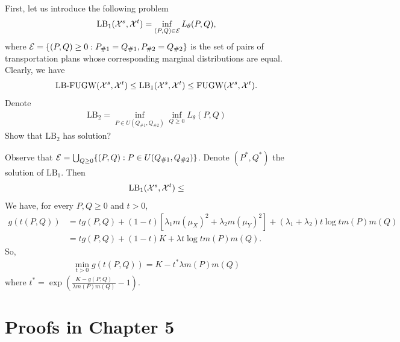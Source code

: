 First,
let us introduce the following problem
\begin{equation}
  \text{LB}_1(\mathcal X^s, \mathcal X^t) = \inf_{(P, Q) \in \mathcal E} L_{\theta}(P, Q),
\end{equation}
where $\mathcal E = \{(P, Q) \geq 0: P_{\#1} = Q_{\#1}, P_{\#2} = Q_{\#2} \}$ is
the set of pairs of transportation plans whose corresponding marginal distributions are equal.
Clearly, we have
\begin{equation}
    \text{LB-FUGW} (\mathcal X^s, \mathcal X^t) \leq \text{LB}_1(\mathcal X^s, \mathcal X^t)
    \leq \text{FUGW}(\mathcal X^s, \mathcal X^t).
\end{equation}
Denote
\begin{align}
  \text{LB}_2 = \inf_{P \in U(Q_{\# 1}, Q_{\# 2})} \inf_{Q \geq 0} L_{\theta}(P, Q)
\end{align}
Show that $\text{LB}_2$ has solution?

Observe that $\mathcal E = \bigcup_{Q \geq 0} \{(P, Q): P \in U(Q_{\# 1}, Q_{\# 2}) \}$.
Denote $(P^*, Q^*)$ the solution of $\text{LB}_1$. Then
\begin{align*}
  \text{LB}_1(\mathcal X^s, \mathcal X^t) \leq
\end{align*}
We have, for every $P, Q \geq 0$ and $t > 0$,
\begin{align}
  g(t(P, Q)) &= t g(P, Q) + (1-t) \left[ \lambda_1 m(\mu_X)^2 + \lambda_2 m(\mu_Y)^2 \right]
  + (\lambda_1 + \lambda_2) t \log t m(P) m(Q) \\
  &= t g(P, Q) + (1 - t) K + \lambda t \log t m(P) m(Q).
\end{align}
So,
\begin{align}
  \min_{t > 0} g(t(P, Q)) = K - t^* \lambda m(P) m(Q)
\end{align}
where $t^* = \exp \left( \frac{K - g(P, Q)}{\lambda m(P) m(Q)} - 1 \right)$.

\section{Proofs in Chapter 5}

